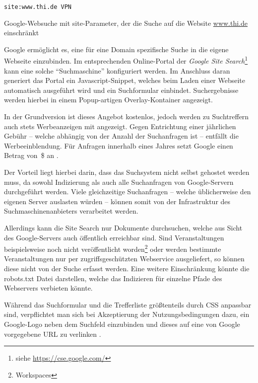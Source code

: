\begin{listing}[ht!]
\begin{verbatim}
site:www.thi.de VPN
\end{verbatim}
\caption[Google-Websuche mit site-Parameter]{Google-Websuche mit site-Parameter, der die Suche auf die Website \url{www.thi.de} einschränkt}
\label{lst:google_site_search_param}
\end{listing}

Google ermöglicht es, eine für eine Domain spezifische Suche in die eigene Webseite einzubinden. Im entsprechenden Online-Portal der \emph{Google Site Search}\footnote{siehe \url{https://cse.google.com/}} kann eine solche \enquote{Suchmaschine} konfiguriert werden. Im Anschluss daran generiert das Portal ein Javascript-Snippet, welches beim Laden einer Webseite automatisch ausgeführt wird und ein Suchformular einbindet. Suchergebnisse werden hierbei in einem Popup-artigen Overlay-Kontainer angezeigt.

In der Grundversion ist dieses Angebot kostenlos, jedoch werden zu Suchtreffern auch stets Werbeanzeigen mit angezeigt. Gegen Entrichtung einer jährlichen Gebühr -- welche abhängig von der Anzahl der Suchanfragen ist -- entfällt die Werbeeinblendung. Für  Anfragen innerhalb eines Jahres setzt Google einen Betrag von \,\$ an \cite{Google.2015}.

Der Vorteil liegt hierbei darin, dass das Suchsystem nicht selbst gehostet werden muss, da sowohl Indizierung als auch alle Suchanfragen von Google-Servern durchgeführt werden. Viele gleichzeitige Suchanfragen -- welche üblicherweise den eigenen Server auslasten würden -- können somit von der Infrastruktur des Suchmaschinenanbieters verarbeitet werden.

Allerdings kann die Site Search nur Dokumente durchsuchen, welche aus Sicht des Google-Servers auch öffentlich erreichbar sind. Sind Veranstaltungen beispielsweise noch nicht veröffentlicht worden\footnote{Workspaces} oder werden bestimmte Veranstaltungen nur per zugriffsgeschützten Webservice ausgeliefert, so können diese nicht von der Suche erfasst werden. Eine weitere Einschränkung könnte die robots.txt Datei darstellen, welche das Indizieren für einzelne Pfade des Webservers verbieten könnte.

Während das Suchformular und die Trefferliste größtenteils durch CSS anpassbar sind, verpflichtet man sich bei Akzeptierung der Nutzungsbedingungen dazu, ein Google-Logo neben dem Suchfeld einzubinden und dieses auf eine von Google vorgegebene URL zu verlinken \cite[2.1]{Google.2011}.

